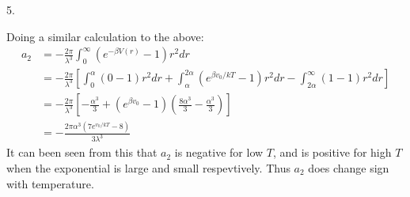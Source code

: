 \documentclass[a4paper,12pt]{article}
\begin{document}
5.
\begin{minipage}[t]{0.9\textwidth}
  Doing a similar calculation to the above:
  \begin{align*}
    a_2 &= -\frac{2 \pi}{\lambda^3} \int_0^\infty(e^{-\beta V(r)} - 1)r^2dr\\
        &= -\frac{2 \pi}{\lambda^3} \left[\int_0^\alpha(0 - 1)r^2dr + \int_\alpha^{2\alpha}(e^{\beta v_0/kT} - 1)r^2dr - \int_{2\alpha}^\infty(1 - 1)r^2dr\right]\\
        &= -\frac{2 \pi}{\lambda^3} \left[-\frac{\alpha^3}{3} + (e^{\beta v_0} - 1)\left(\frac{8 \alpha^3}{3} - \frac{\alpha^3}{3}\right)\right]\\
        &= -\frac{2 \pi \alpha^3 (7e^{v_0/kT} - 8 )}{3\lambda^3}
  \end{align*}
  It can been seen from this that $a_2$ is negative for low $T$, and is positive for high $T$ when the exponential is large and small respevtively.
  Thus $a_2$ does change sign with temperature.
\end{minipage}
\end{document}
